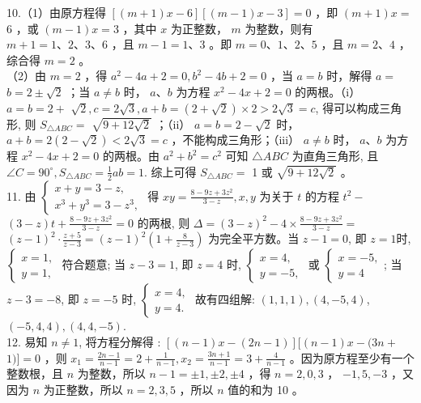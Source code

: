 \documentclass[10pt]{article}
\begin{document}
10.（1）由原方程得 $[(m+1) x-6][(m-1) x-3]=0$ ，即 $(m+1) x=$ 6 ，或 $(m-1) x=3$ ，其中 $x$ 为正整数， $m$ 为整数，则有 $m+1=1 、 2 、 3 、 6$ ，且 $m-1=1 、 3$ 。即 $m=0 、 1 、 2 、 5$ ，且 $m=2 、 4$ ，综合得 $m=2$ 。\\
（2）由 $m=2$ ，得 $a^{2}-4 a+2=0, b^{2}-4 b+2=0$ ，当 $a=b$ 时，解得 $a=$ $b=2 \pm \sqrt{2}$ ；当 $a \neq b$ 时， $a 、 b$ 为方程 $x^{2}-4 x+2=0$ 的两根。（i） $a=b=2+$ $\sqrt{2}, c=2 \sqrt{3}, a+b=(2+\sqrt{2}) \times 2>2 \sqrt{3}=c$, 得可以构成三角形, 则 $S_{\triangle A B C}=$ $\sqrt{9+12 \sqrt{2}}$ ；（ii） $a=b=2-\sqrt{2}$ 时， $a+b=2(2-\sqrt{2})<2 \sqrt{3}=c$ ，不能构成三角形；（iii） $a \neq b$ 时， $a 、 b$ 为方程 $x^{2}-4 x+2=0$ 的两根。由 $a^{2}+b^{2}=c^{2}$ 可知 $\triangle A B C$ 为直角三角形, 且 $\angle C=90^{\circ}, S_{\triangle A B C}=\frac{1}{2} a b=1$. 综上可得 $S_{\triangle A B C}=$ 1 或 $\sqrt{9+12 \sqrt{2}}$ 。\\
11. 由 $\left\{\begin{array}{l}x+y=3-z, \\ x^{3}+y^{3}=3-z^{3},\end{array}\right.$ 得 $x y=\frac{8-9 z+3 z^{2}}{3-z}, x, y$ 为关于 $t$ 的方程 $t^{2}-$ $(3-z) t+\frac{8-9 z+3 z^{2}}{3-z}=0$ 的两根, 则 $\Delta=(3-z)^{2}-4 \times \frac{8-9 z+3 z^{2}}{3-z}=$\\
$(z-1)^{2} \cdot \frac{z+5}{z-3}=(z-1)^{2}\left(1+\frac{8}{z-3}\right)$ 为完全平方数。当 $z-1=0$, 即 $z=1$时, $\left\{\begin{array}{l}x=1, \\ y=1,\end{array}\right.$ 符合题意; 当 $z-3=1$, 即 $z=4$ 时, $\left\{\begin{array}{l}x=4, \\ y=-5,\end{array}\right.$ 或 $\left\{\begin{array}{l}x=-5, \\ y=4\end{array}\right.$; 当 $z-3=-8$, 即 $z=-5$ 时, $\left\{\begin{array}{l}x=4, \\ y=4 .\end{array}\right.$ 故有四组解: $(1,1,1),(4,-5,4)$, $(-5,4,4),(4,4,-5)$.\\
12. 易知 $n \neq 1$, 将方程分解得 : $[(n-1) x-(2 n-1)][(n-1) x-(3 n+$ $1)]=0$ ，则 $x_{1}=\frac{2 n-1}{n-1}=2+\frac{1}{n-1}, x_{2}=\frac{3 n+1}{n-1}=3+\frac{4}{n-1}$ 。因为原方程至少有一个整数根，且 $n$ 为整数，所以 $n-1= \pm 1, \pm 2, \pm 4$ ，得 $n=2,0,3$ ， $-1,5,-3$ ，又因为 $n$ 为正整数，所以 $n=2,3,5$ ，所以 $n$ 值的和为 10 。\\
\end{document}
